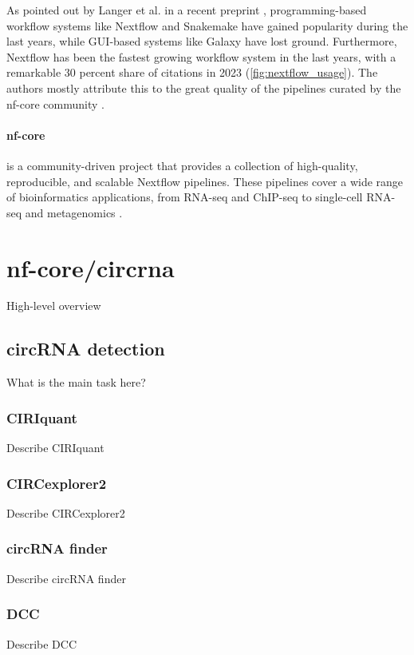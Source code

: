 As pointed out by Langer et al. in a recent preprint
\supercite{langer_empowering_2024}, programming-based workflow systems like
Nextflow and Snakemake have gained popularity during the last years, while
GUI-based systems like Galaxy have lost ground. Furthermore, Nextflow has been
the fastest growing workflow system in the last years, with a remarkable 30
percent share of citations in 2023 (\cref{fig:nextflow_usage}). The authors
mostly attribute this to the great quality of the pipelines curated by the
nf-core community \supercite{langer_empowering_2024,grayson_automatic_2023}.

\paragraph{nf-core} is a community-driven project that provides a collection of
high-quality, reproducible, and scalable Nextflow pipelines. These pipelines cover a wide range of
bioinformatics applications, from RNA-seq and ChIP-seq to single-cell RNA-seq
and metagenomics \supercite{ewels_nf-core_2020}.

\section{nf-core/circrna}
High-level overview

\subsection{circRNA detection}
What is the main task here?

\subsubsection{CIRIquant}
Describe CIRIquant

\subsubsection{CIRCexplorer2}
Describe CIRCexplorer2

\subsubsection{circRNA finder}
Describe circRNA finder

\subsubsection{DCC}
Describe DCC

